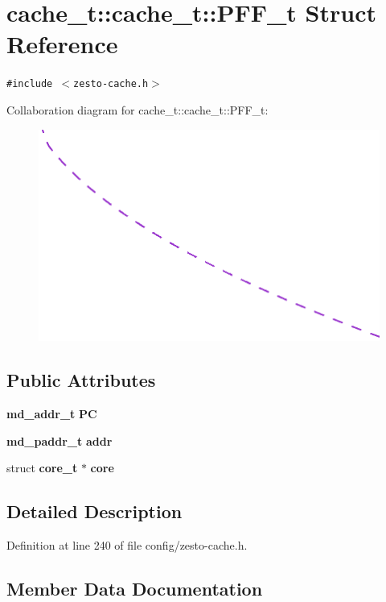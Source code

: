 \section{cache\_\-t::cache\_\-t::PFF\_\-t Struct Reference}
\label{structcache__t_1_1PFF__t}
{\tt \#include $<$zesto-cache.h$>$}

Collaboration diagram for cache\_\-t::cache\_\-t::PFF\_\-t:\nopagebreak
\begin{figure}[H]
\begin{center}
\leavevmode
\includegraphics[width=400pt]{structcache__t_1_1PFF__t__coll__graph}
\end{center}
\end{figure}
\subsection*{Public Attributes}
\begin{CompactItemize}
\item 
{\bf md\_\-addr\_\-t} {\bf PC}
\item 
{\bf md\_\-paddr\_\-t} {\bf addr}
\item 
struct {\bf core\_\-t} $\ast$ {\bf core}
\end{CompactItemize}


\subsection{Detailed Description}


Definition at line 240 of file config/zesto-cache.h.

\subsection{Member Data Documentation}
